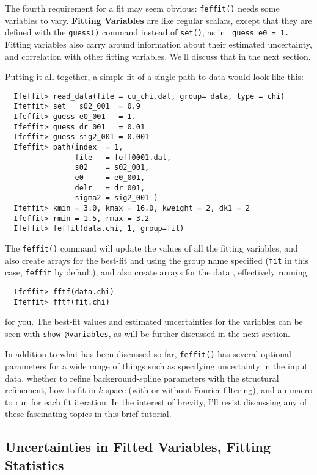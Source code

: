 \documentclass[11pt]{article}
\begin{document}
The fourth requirement for a fit may seem obvious: {\tt{feffit()}} needs
some variables to vary.  {\bf{Fitting Variables}} are like regular scalars,
except that they are defined with the {\tt{guess()}} command instead of
{\tt{set()}}, as in {\tt{ guess e0 = 1.}} .  Fitting variables also carry
around information about their estimated uncertainty, and correlation with
other fitting variables.  We'll discuss that in the next section.

Putting it all together, a simple fit of a single {\feff} path to {\chik}
data would look like this:
{\small\begin{verbatim}
  Ifeffit> read_data(file = cu_chi.dat, group= data, type = chi)
  Ifeffit> set   s02_001  = 0.9
  Ifeffit> guess e0_001   = 1.
  Ifeffit> guess dr_001   = 0.01
  Ifeffit> guess sig2_001 = 0.001
  Ifeffit> path(index  = 1,
                file   = feff0001.dat,
                s02    = s02_001,
                e0     = e0_001,
                delr   = dr_001,
                sigma2 = sig2_001 )
  Ifeffit> kmin = 3.0, kmax = 16.0, kweight = 2, dk1 = 2
  Ifeffit> rmin = 1.5, rmax = 3.2
  Ifeffit> feffit(data.chi, 1, group=fit)
\end{verbatim}
}\noindent
The {\tt{feffit()}} command will update the values of all the fitting
variables, and also create arrays for the best-fit {\chik} and {\chir}
using the group name specified ({\tt{fit}} in this case, {\tt{feffit}} by
default), and also create arrays for the data {\chir}, effectively running
{\small\begin{verbatim}
  Ifeffit> fftf(data.chi)
  Ifeffit> fftf(fit.chi)
\end{verbatim}
}\noindent
for you.  The best-fit values and estimated uncertainties for the variables
can be seen with {\tt{show @variables}}, as will be further discussed in
the next section.

In addition to what has been discussed so far, {\tt{feffit()}} has several
optional parameters for a wide range of things such as specifying
uncertainty in the input data, whether to refine background-spline
parameters with the structural refinement, how to fit in $k$-space (with or
without Fourier filtering), and an {\ifeffit} macro to run for each fit
iteration.  In the interest of brevity, I'll resist discussing any of these
fascinating topics in this brief tutorial.

\subsection{Uncertainties in Fitted Variables, Fitting Statistics}
\label{s:xafs-process:uncertainties}
\end{document}
